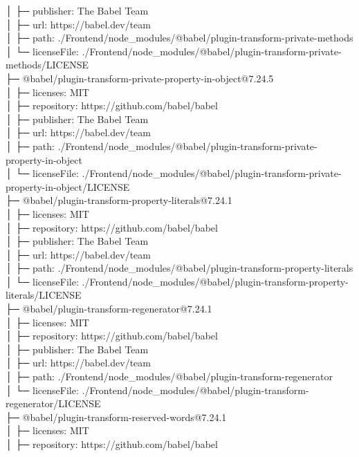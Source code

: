 │  ├─ publisher: The Babel Team\\
│  ├─ url: https://babel.dev/team\\
│  ├─ path: ./Frontend/node\_modules/@babel/plugin-transform-private-methods\\
│  └─ licenseFile: ./Frontend/node\_modules/@babel/plugin-transform-private-methods/LICENSE\\
├─ @babel/plugin-transform-private-property-in-object@7.24.5\\
│  ├─ licenses: MIT\\
│  ├─ repository: https://github.com/babel/babel\\
│  ├─ publisher: The Babel Team\\
│  ├─ url: https://babel.dev/team\\
│  ├─ path: ./Frontend/node\_modules/@babel/plugin-transform-private-property-in-object\\
│  └─ licenseFile: ./Frontend/node\_modules/@babel/plugin-transform-private-property-in-object/LICENSE\\
├─ @babel/plugin-transform-property-literals@7.24.1\\
│  ├─ licenses: MIT\\
│  ├─ repository: https://github.com/babel/babel\\
│  ├─ publisher: The Babel Team\\
│  ├─ url: https://babel.dev/team\\
│  ├─ path: ./Frontend/node\_modules/@babel/plugin-transform-property-literals\\
│  └─ licenseFile: ./Frontend/node\_modules/@babel/plugin-transform-property-literals/LICENSE\\
├─ @babel/plugin-transform-regenerator@7.24.1\\
│  ├─ licenses: MIT\\
│  ├─ repository: https://github.com/babel/babel\\
│  ├─ publisher: The Babel Team\\
│  ├─ url: https://babel.dev/team\\
│  ├─ path: ./Frontend/node\_modules/@babel/plugin-transform-regenerator\\
│  └─ licenseFile: ./Frontend/node\_modules/@babel/plugin-transform-regenerator/LICENSE\\
├─ @babel/plugin-transform-reserved-words@7.24.1\\
│  ├─ licenses: MIT\\
│  ├─ repository: https://github.com/babel/babel\\

